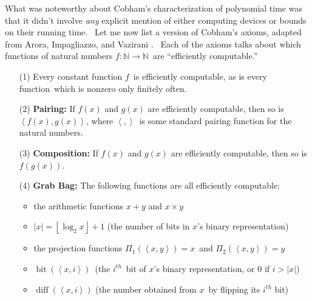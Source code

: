 \documentclass[12pt,onecolumn]{article}%
\begin{document}
What was noteworthy about Cobham's characterization of polynomial time was
that it didn't involve \textit{any} explicit mention of either computing
devices or bounds on their running time. \ Let me now list a version of
Cobham's axioms, adapted from Arora, Impagliazzo, and Vazirani \cite{aiv}.
\ Each of the axioms talks about which functions of natural numbers
$f:\mathbb{N}\rightarrow\mathbb{N}$\ are \textquotedblleft efficiently
computable.\textquotedblright

\begin{enumerate}
\item[(1)] Every constant function $f$\ is efficiently computable, as is every
function\ which is nonzero only finitely often.

\item[(2)] \textbf{Pairing:} If $f\left(  x\right)  $ and $g\left(  x\right)
$ are efficiently computable, then so is $\left\langle f\left(  x\right)
,g\left(  x\right)  \right\rangle $, where $\left\langle ,\right\rangle $\ is
some standard pairing function for the natural numbers.

\item[(3)] \textbf{Composition:} If $f\left(  x\right)  $ and $g\left(
x\right)  $ are efficiently computable, then so is $f\left(  g\left(
x\right)  \right)  $.

\item[(4)] \textbf{Grab Bag:} The following functions are all efficiently computable:

\begin{itemize}
\item the arithmetic functions $x+y$ and $x\times y$

\item $\left\vert x\right\vert =\left\lfloor \log_{2}x\right\rfloor +1$ (the
number of bits in $x$'s binary representation)

\item the projection functions $\Pi_{1}\left(  \left\langle x,y\right\rangle
\right)  =x$\ and $\Pi_{2}\left(  \left\langle x,y\right\rangle \right)  =y$

\item $\operatorname*{bit}\left(  \left\langle x,i\right\rangle \right)
$\ (the $i^{th}$\ bit of $x$'s binary representation, or $0$ if $i>\left\vert
x\right\vert $)

\item $\operatorname*{diff}\left(  \left\langle x,i\right\rangle \right)  $
(the number obtained from $x$\ by flipping its $i^{th}$ bit)


\end{itemize}
\end{enumerate}
\end{document}
